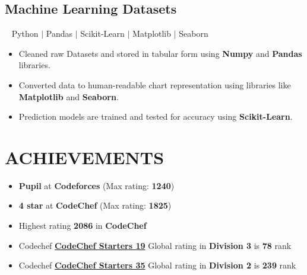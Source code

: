 \documentclass[12pt]{article}
\begin{document}
\subsection*{Machine Learning Datasets}~ Python $\vert$ Pandas $\vert$ Scikit-Learn $\vert$ Matplotlib $\vert$ Seaborn \\
\begin{itemize}[topsep=0pt,itemsep=1pt,partopsep=1pt, parsep=1pt]
    \item Cleaned raw Datasets and stored in tabular form using \textbf{Numpy} and \textbf{Pandas} libraries.
    \item Converted data to human-readable chart representation using libraries like \textbf{Matplotlib} and \textbf{Seaborn}.
    \item Prediction models are trained and tested for accuracy using \textbf{Scikit-Learn}.
\end{itemize}
\section*{ACHIEVEMENTS}
\begin{itemize}[leftmargin=*, topsep=0pt,itemsep=2pt,partopsep=2pt, parsep=2pt]
\item \textbf{Pupil} at \textbf{Codeforces} (Max rating: \textbf{1240})
\item \textbf{4 star} at \textbf{CodeChef} (Max rating: \textbf{1825})
\item Highest rating \textbf{2086} in \textbf{CodeChef}
\item Codechef \href{https://www.codechef.com/rankings/START19C?search=tanishka125}{\textbf{CodeChef Starters 19}}
             Global rating in \textbf{Division 3} is \textbf{78} rank
\item Codechef \href{https://www.codechef.com/rankings/START35B?search=tanishka125}{\textbf{CodeChef Starters 35}}
             Global rating in \textbf{Division 2} is \textbf{239} rank
\end{itemize}
\end{document}
